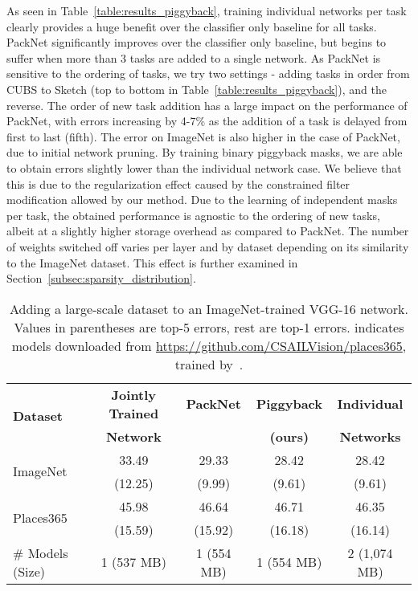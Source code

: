 \documentclass{llncs}
\begin{document}
As seen in Table~\ref{table:results_piggyback}, training individual networks per task clearly provides a huge benefit over the classifier only baseline for all tasks. 
PackNet significantly improves over the classifier only baseline, but begins to suffer when more than 3 tasks are added to a single network. As PackNet is sensitive to the ordering of tasks, we try two settings - adding tasks in order from CUBS to Sketch (top to bottom in Table~\ref{table:results_piggyback}), and the reverse.
The order of new task addition has a large impact on the performance of PackNet, with errors increasing by 4-7\% as the addition of a task is delayed from first to last (fifth). The error on ImageNet is also higher in the case of PackNet, due to initial network pruning. 
By training binary piggyback masks, we are able to obtain errors slightly lower than the individual network case. We believe that this is due to the regularization effect caused by the constrained filter modification allowed by our method. Due to the learning of independent masks per task, the obtained performance is agnostic to the ordering of new tasks, albeit at a slightly higher storage overhead as compared to PackNet. The number of weights switched off varies per layer and by dataset depending on its similarity to the ImageNet dataset. This effect is further examined in Section~\ref{subsec:sparsity_distribution}.

\begin{table*}[t!]
  \centering
  \begin{tabular}{l||c|c|c|c}
    \hline
    \multirow{2}{*}{\bf Dataset} & {\bf Jointly Trained} & {\bf PackNet} & {\bf Piggyback} & {\bf Individual} \\ & {\bf Network} & {\bf \cite{mallya2017packnet}} & {\bf (ours)} & {\bf Networks} \\\hline\hline
    \multirow{2}{*}{ImageNet} & 33.49 & 29.33 & 28.42 & 28.42 \\
    & (12.25) & (9.99) & (9.61) & (9.61) \\\hline
    \multirow{2}{*}{Places365} & 45.98 & 46.64 & 46.71 & 46.35 \\
    & (15.59) & (15.92) & (16.18) & (16.14) \\\hline\hline
    \# Models (Size) & 1 (537 MB) & {1 (554 MB)} & 1 (554 MB) & {2 (1,074 MB)} \\\hline
  \end{tabular}
  \caption{Adding a large-scale dataset to an ImageNet-trained VGG-16 network. Values in parentheses are top-5 errors, rest are top-1 errors. 
   indicates models downloaded from {\small \url{https://github.com/CSAILVision/places365}}, trained by~\cite{zhou2017places}.}
  \label{table:results_places}
\end{table*}
\end{document}
